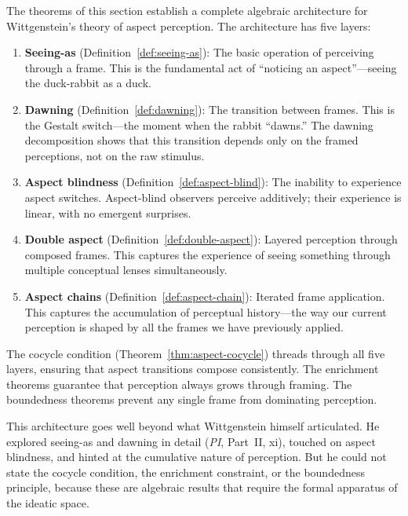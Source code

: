\begin{interpretation}
The theorems of this section establish a complete algebraic architecture
for Wittgenstein's theory of aspect perception. The architecture has five
layers:

\begin{enumerate}
\item \textbf{Seeing-as} (Definition~\ref{def:seeing-as}): The basic operation
of perceiving through a frame. This is the fundamental act of ``noticing an
aspect''---seeing the duck-rabbit as a duck.

\item \textbf{Dawning} (Definition~\ref{def:dawning}): The transition between
frames. This is the Gestalt switch---the moment when the rabbit ``dawns.''
The dawning decomposition shows that this transition depends only on the
framed perceptions, not on the raw stimulus.

\item \textbf{Aspect blindness} (Definition~\ref{def:aspect-blind}): The
inability to experience aspect switches. Aspect-blind observers perceive
additively; their experience is linear, with no emergent surprises.

\item \textbf{Double aspect} (Definition~\ref{def:double-aspect}): Layered
perception through composed frames. This captures the experience of seeing
something through multiple conceptual lenses simultaneously.

\item \textbf{Aspect chains} (Definition~\ref{def:aspect-chain}): Iterated
frame application. This captures the accumulation of perceptual history---the
way our current perception is shaped by all the frames we have previously
applied.
\end{enumerate}

The cocycle condition (Theorem~\ref{thm:aspect-cocycle}) threads through all
five layers, ensuring that aspect transitions compose consistently. The
enrichment theorems guarantee that perception always grows through framing.
The boundedness theorems prevent any single frame from dominating perception.

This architecture goes well beyond what Wittgenstein himself articulated. He
explored seeing-as and dawning in detail (\textit{PI}, Part~II, xi), touched
on aspect blindness, and hinted at the cumulative nature of perception. But
he could not state the cocycle condition, the enrichment constraint, or the
boundedness principle, because these are algebraic results that require the
formal apparatus of the ideatic space.
\end{interpretation}

